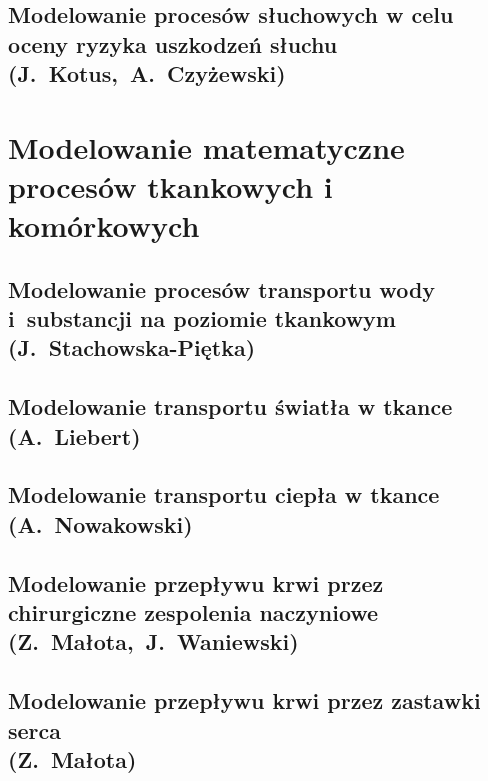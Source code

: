 \documentclass[11pt,a4paper,twoside,openright,final]{memoir}
\begin{document}
			\chapter[Modelowanie procesów słuchowych w celu oceny ryzyka uszkodzeń słuchu]{Modelowanie procesów słuchowych w celu oceny ryzyka uszkodzeń słuchu\\{\large (J.~Kotus,~A.~Czyżewski)}}
			
			
		\part{Modelowanie matematyczne procesów tkankowych i komórkowych}
		
			\chapter[Modelowanie procesów transportu wody i~substancji na poziomie tkankowym]{Modelowanie procesów transportu wody i~substancji na poziomie tkankowym\\{\large (J.~Stachowska-Piętka)}}
			
			\chapter[Modelowanie transportu światła w tkance]{Modelowanie transportu światła w tkance\\{\large (A.~Liebert)}}
			
			\chapter[Modelowanie transportu ciepła w tkance]{Modelowanie transportu ciepła w tkance\\{\large (A.~Nowakowski)}}
			
			\chapter[Modelowanie przepływu krwi przez chirurgiczne zespolenia naczyniowe]{Modelowanie przepływu krwi przez chirurgiczne zespolenia naczyniowe\\{\large (Z.~Małota,~J.~Waniewski)}}
			
			\chapter[Modelowanie przepływu krwi przez zastawki serca]{Modelowanie przepływu krwi przez zastawki serca\\{\large (Z.~Małota)}}
			
\end{document}

